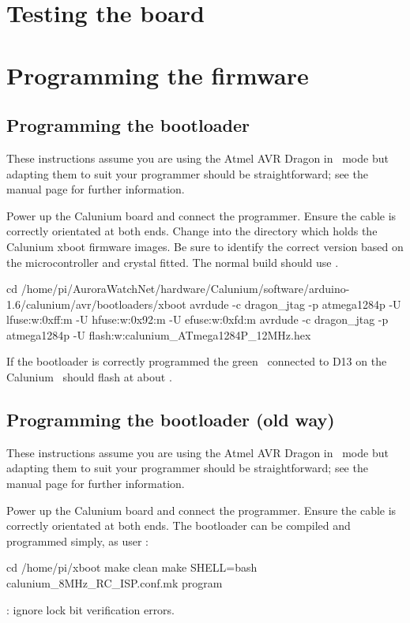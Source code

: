 \section{Testing the board}

\section{Programming the firmware}

\subsection{Programming the bootloader}

These instructions assume you are using the Atmel AVR Dragon in \jtag\
mode but adapting them to suit your programmer should be
straightforward; see the  manual page for further
information.

Power up the Calunium board and connect the programmer. Ensure the
cable is correctly orientated at both ends. Change into the directory
which holds the Calunium xboot firmware images. Be sure to identify
the correct version based on the microcontroller and crystal
fitted. The normal build should use
.

\begin{Cmd}
cd /home/pi/AuroraWatchNet/hardware/Calunium/software/arduino-1.6/calunium/avr/bootloaders/xboot
avrdude -c dragon_jtag -p atmega1284p -U lfuse:w:0xff:m -U hfuse:w:0x92:m -U efuse:w:0xfd:m
avrdude -c dragon_jtag -p atmega1284p -U flash:w:calunium_ATmega1284P_12MHz.hex
\end{Cmd}

If the bootloader is correctly programmed the green \led\ connected to
D13 on the Calunium \pcb\ should flash at about \Hz{1}.

\subsection{Programming the bootloader (old way)}

These instructions assume you are using the Atmel AVR Dragon in \isp\
mode but adapting them to suit your programmer should be
straightforward; see the \filename{avrdude} manual page for further
information.

Power up the Calunium board and connect the programmer. Ensure the
cable is correctly orientated at both ends. The bootloader can be
compiled and programmed simply, as user \piUser: \todo[Check directory]
\begin{Cmd}
cd /home/pi/xboot
make clean
make SHELL=bash calunium_8MHz_RC_ISP.conf.mk program
\end{Cmd}
\todo: ignore lock bit verification errors.

